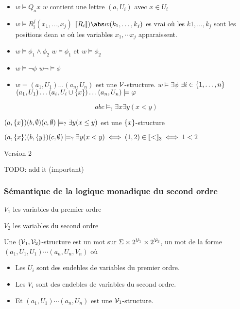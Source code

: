 \begin{itemize}
	\item $w \models Q_a x$ \ssi $w$ contient une lettre $(a,U_i)$ avec $x \in U_i$
	\item $w \models R_i^j(x_1, \ldots, x_j)$ \ssi $\interpret {R_i}){\abs w}(k_1, \ldots, k_j)$ es vrai où les $k1, \ldots, k_j$ sont les positions dean $w$ où les variables
	      $x_1, \cdots x_j$ apparaissent.
	\item $w \models \phi_1 \land \phi_2$ \ssi $w \models \phi_1$ et $w \models \phi_2$
	\item $w \models \lnot \phi$ \ssi $w \neg \models \phi$
	\item $w = (a_1, U_1) \ldots (a_n, U_n)$ est une $\mathcal{V}$-structure.
	      $w \models \exists \phi$ \ssi $\exists i \in \left\{1, \ldots, n\right\}$
	      $(a_1, U_1) \ldots  (a_i, U_i \cup \left\{x\right\})  \ldots (a_n, U_n) \models \varphi$
\end{itemize}

\begin{exemple}
	$$abc \models_? \exists x \exists y (x < y)$$

	$(a, \left\{x\right\})(b, \emptyset)(c, \emptyset) \models_? \exists y (x \leq y)$ est une $\left\{x\right\} $-structure

	$(a, \left\{x\right\})(b, \left\{y\right\})(c, \emptyset) \models_? \exists y (x < y) \iff (1,2) \in \llbracket < \rrbracket_3 \iff 1 < 2$

	Version 2

\end{exemple}


\begin{exemple}
	TODO: add it (important)
\end{exemple}


\subsubsection{Sémantique de la logique monadique du second ordre}


$V_1$ les variables du premier ordre

$V_2$ les variables du second ordre


\begin{definition}
	Une $(\mathcal{V}_1,\mathcal{V}_2)$-structure est un mot sur $\Sigma \times 2^{\mathcal{V}_1} \times  2^{\mathcal{V}_2}$, \cad un mot de la forme
	$(a_1,U_1,U_1) \cdots (a_n,U_n,V_n)$ où
	\begin{itemize}
		\item Les $U_i$ sont des endebles de variables du premier ordre.
		\item Les $V_i$ sont des endebles de variables du second ordre.
		\item Et
		      $(a_1,U_1) \cdots (a_n,U_n)$ est une $\mathcal{V}_1$-structure.
	\end{itemize}
\end{definition}

